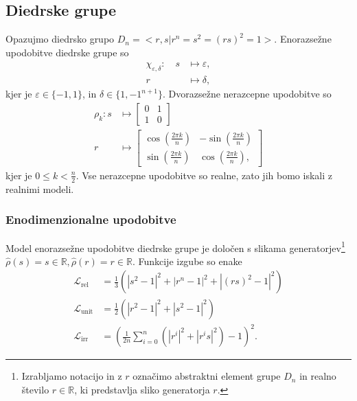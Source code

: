 \documentclass[mat2, tisk]{fmfdelo}
\newcommand{\R}{\mathbb R}
\newcommand{\Loss}[1]{\mathcal L _\text{#1}}
\begin{document}
      \subsection{Diedrske grupe}
      \label{subsection: diedrske grupe}
      Opazujmo diedrsko grupo $D_n = <r, s|r^n=s^2 = (rs)^2 = 1>$.
      Enorazsežne upodobitve diedrske grupe so
      \begin{align*}
        \chi_{\varepsilon, \delta} \colon \quad
        s &\mapsto \varepsilon, \\
        r &\mapsto \delta,
      \end{align*}
      kjer je  \( \varepsilon \in \{-1, 1\} \), in $\delta \in \{1,
      -1^{n + 1}\}$.
      Dvorazsežne nerazcepne upodobitve so
      \begin{align*}
        \rho_k \colon  s &\mapsto
        \begin{bmatrix}
          0 & 1 \\
          1 & 0
        \end{bmatrix}\\
        r &\mapsto
        \begin{bmatrix}
          \cos\left(\frac{2\pi k}{n}\right) & -\sin\left(\frac{2\pi
          k}{n}\right) \\
          \sin\left(\frac{2\pi k}{n}\right) & \cos\left(\frac{2\pi k}{n}\right),
        \end{bmatrix}
      \end{align*}
      kjer je $0 \leq k < \frac{n}{2} $. Vse nerazcepne upodobitve so
      realne, zato jih bomo iskali z realnimi modeli.
      \subsubsection{Enodimenzionalne upodobitve}
      Model enorazsežne upodobitve diedrske grupe
      je določen s slikama generatorjev\footnote{Izrabljamo notacijo
        in z $r$ označimo abstraktni element grupe $D_n$ in realno
      število $r \in \R$, ki predstavlja sliko generatorja $r$.}
      $\hat \rho(s) = s \in \R, \hat \rho(r)=r \in \R$. Funkcije izgube so enake
      \begin{align*}
        \Loss{rel} &= \frac{1}{3} \left( |s^2 -1|^2 + |r^n -1|^2  +
        |(rs)^2 -1|^2  \right )\\
        \Loss{unit} &=  \frac{1}{2} \left ( |r^2 -1|^2 + |s ^2 -1|^2
        \right)  \\
        \Loss{irr} &= \left ( \frac{1}{2n}\sum_{i=0}^n(|r^i|^2 +
        |r^is|^2)    - 1\right )^2.
      \end{align*}
\end{document}
